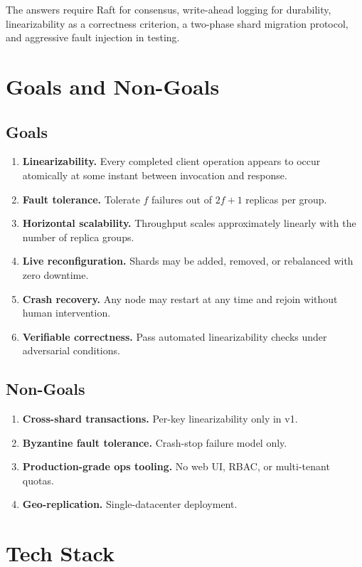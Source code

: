 \documentclass[11pt,a4paper]{article}
\begin{document}
The answers require Raft for consensus, write-ahead logging for durability, linearizability as a correctness criterion, a two-phase shard migration protocol, and aggressive fault injection in testing.

\section{Goals and Non-Goals}

\subsection{Goals}
\begin{enumerate}[leftmargin=1.5em,itemsep=0.2em]
  \item \textbf{Linearizability.} Every completed client operation appears to occur atomically at some instant between invocation and response.
  \item \textbf{Fault tolerance.} Tolerate $f$ failures out of $2f+1$ replicas per group.
  \item \textbf{Horizontal scalability.} Throughput scales approximately linearly with the number of replica groups.
  \item \textbf{Live reconfiguration.} Shards may be added, removed, or rebalanced with zero downtime.
  \item \textbf{Crash recovery.} Any node may restart at any time and rejoin without human intervention.
  \item \textbf{Verifiable correctness.} Pass automated linearizability checks under adversarial conditions.
\end{enumerate}

\subsection{Non-Goals}
\begin{enumerate}[leftmargin=1.5em,itemsep=0.2em]
  \item \textbf{Cross-shard transactions.} Per-key linearizability only in v1.
  \item \textbf{Byzantine fault tolerance.} Crash-stop failure model only.
  \item \textbf{Production-grade ops tooling.} No web UI, RBAC, or multi-tenant quotas.
  \item \textbf{Geo-replication.} Single-datacenter deployment.
\end{enumerate}

\section{Tech Stack}
\end{document}
